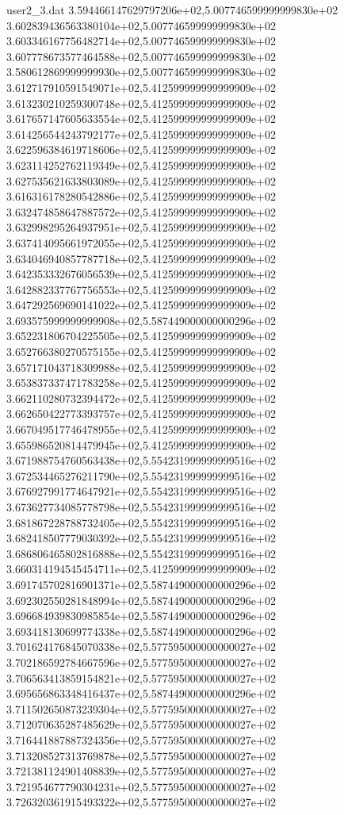 \begin{filecontents}{user2_3.dat}
3.594466147629797206e+02,5.007746599999999830e+02
3.602839436563380104e+02,5.007746599999999830e+02
3.603346167756482714e+02,5.007746599999999830e+02
3.607778673577464588e+02,5.007746599999999830e+02
3.580612869999999930e+02,5.007746599999999830e+02
3.612717910591549071e+02,5.412599999999999909e+02
3.613230210259300748e+02,5.412599999999999909e+02
3.617657147605633554e+02,5.412599999999999909e+02
3.614256544243792177e+02,5.412599999999999909e+02
3.622596384619718606e+02,5.412599999999999909e+02
3.623114252762119349e+02,5.412599999999999909e+02
3.627535621633803089e+02,5.412599999999999909e+02
3.616316178280542886e+02,5.412599999999999909e+02
3.632474858647887572e+02,5.412599999999999909e+02
3.632998295264937951e+02,5.412599999999999909e+02
3.637414095661972055e+02,5.412599999999999909e+02
3.634046940857787718e+02,5.412599999999999909e+02
3.642353332676056539e+02,5.412599999999999909e+02
3.642882337767756553e+02,5.412599999999999909e+02
3.647292569690141022e+02,5.412599999999999909e+02
3.693575999999999908e+02,5.587449000000000296e+02
3.652231806704225505e+02,5.412599999999999909e+02
3.652766380270575155e+02,5.412599999999999909e+02
3.657171043718309988e+02,5.412599999999999909e+02
3.653837337471783258e+02,5.412599999999999909e+02
3.662110280732394472e+02,5.412599999999999909e+02
3.662650422773393757e+02,5.412599999999999909e+02
3.667049517746478955e+02,5.412599999999999909e+02
3.655986520814479945e+02,5.412599999999999909e+02
3.671988754760563438e+02,5.554231999999999516e+02
3.672534465276211790e+02,5.554231999999999516e+02
3.676927991774647921e+02,5.554231999999999516e+02
3.673627734085778798e+02,5.554231999999999516e+02
3.681867228788732405e+02,5.554231999999999516e+02
3.682418507779030392e+02,5.554231999999999516e+02
3.686806465802816888e+02,5.554231999999999516e+02
3.660314194545454711e+02,5.412599999999999909e+02
3.691745702816901371e+02,5.587449000000000296e+02
3.692302550281848994e+02,5.587449000000000296e+02
3.696684939830985854e+02,5.587449000000000296e+02
3.693418130699774338e+02,5.587449000000000296e+02
3.701624176845070338e+02,5.577595000000000027e+02
3.702186592784667596e+02,5.577595000000000027e+02
3.706563413859154821e+02,5.577595000000000027e+02
3.695656863348416437e+02,5.587449000000000296e+02
3.711502650873239304e+02,5.577595000000000027e+02
3.712070635287485629e+02,5.577595000000000027e+02
3.716441887887324356e+02,5.577595000000000027e+02
3.713208527313769878e+02,5.577595000000000027e+02
3.721381124901408839e+02,5.577595000000000027e+02
3.721954677790304231e+02,5.577595000000000027e+02
3.726320361915493322e+02,5.577595000000000027e+02

\end{filecontents}
